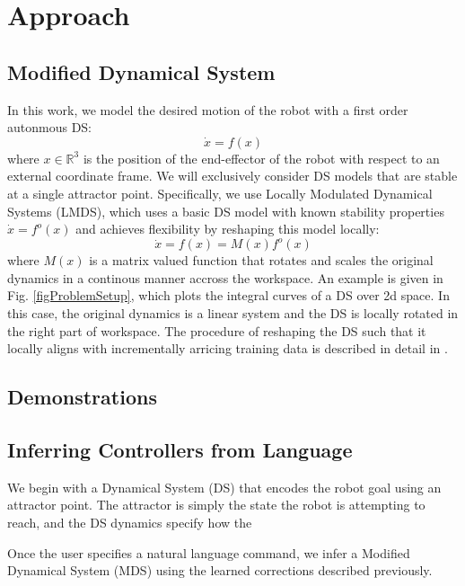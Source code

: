

\section{Approach}
\label{sec:approach}

\subsection{Modified Dynamical System}
In this work, we model the desired motion of the robot with a first order autonmous DS:
\begin{equation}
  \label{eq:DS_general}
  \dot x = f(x)
\end{equation}
where $x \in \mathbb{R}^3$ is the position of the end-effector of the robot with respect to an external coordinate frame. We will exclusively consider DS models that are stable at a single attractor point. Specifically, we use Locally Modulated Dynamical Systems (LMDS), which uses a basic DS model with known stability properties $\dot x = f^o(x)$ and achieves flexibility by reshaping this model locally:
\begin{equation}
  \label{eq:DS_reshaped}
  \dot x = f(x) = M(x)f^o(x)
\end{equation}
where $M(x)$ is a matrix valued function that rotates and scales the original dynamics in a continous manner accross the workspace. An example is given in Fig. \ref{figProblemSetup}, which plots the integral curves of a DS over 2d space. In this case, the original dynamics is a linear system and the DS is locally rotated in the right part of workspace. The procedure of reshaping the DS such that it locally aligns with incrementally arricing training data is described in detail in .
\subsection{Demonstrations}

\subsection{Inferring Controllers from Language}

We begin with a Dynamical System (DS) that encodes the robot goal using an attractor point.
The attractor is simply the state the robot is attempting to reach, and the DS dynamics specify how the

Once the user specifies a natural language command, we infer a Modified Dynamical System (MDS) using the learned corrections described previously.


